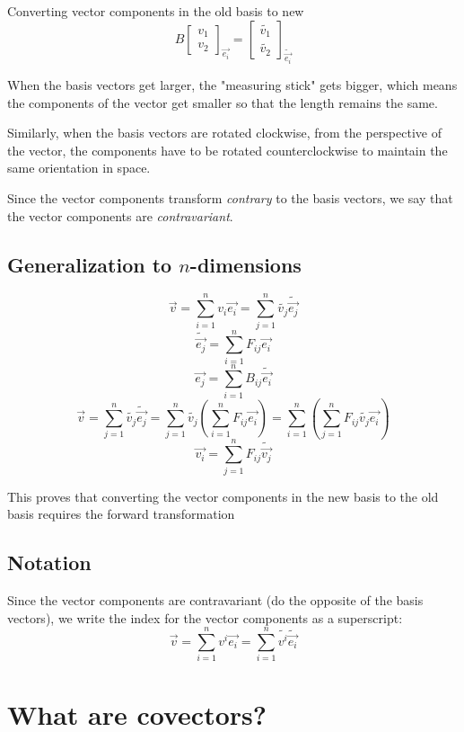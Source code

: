 \documentclass{report}
\begin{document}
Converting vector components in the old basis to new
$$ B\begin{bmatrix} v_1 \\ v_2 \end{bmatrix}_{\vec{e_i}} = \begin{bmatrix} \tilde{v_1} \\ \tilde{v_2} \end{bmatrix}_{\tilde{\vec{e_i}}}   $$ 

When the basis vectors get larger, the "measuring stick" gets bigger, which means the components of the vector get smaller so that the length remains the same.

Similarly, when the basis vectors are rotated clockwise, from the perspective of the vector, the components have to be rotated counterclockwise to maintain the same orientation in space.

Since the vector components transform \emph{contrary} to the basis vectors, we say that the vector components are \emph{contravariant}.

\section{Generalization to $n$-dimensions}
\begin{myproof}
	$$ \vec{v} = \sum_{i=1}^{n} v_i \vec{e_i} = \sum_{j=1}^{n} \tilde{v_j}\tilde{\vec{e_j}}$$
	$$ \widetilde{\vec{e_j}} = \sum_{i=1}^{n} F_{ij} \vec{e_i} $$ 
	$$ \vec{e_j} = \sum_{i=1}^{n} B_{ij} \widetilde{\vec{e_i}} $$ 
	$$ \vec{v} =  \sum_{j=1}^{n} \tilde{v_j}\tilde{\vec{e_j}} =  \sum_{j=1}^{n} \tilde{v_j} \left( \sum_{i=1}^{n} F_{ij} \vec{e_i} \right) = \sum_{i=1}^{n} \left(\sum_{j=1}^{n} F_{ij}  \widetilde{v_j}\vec{e_i}\right) $$
	$$ \vec{v_i} = \sum_{j=1}^{n} F_{ij} \widetilde{\vec{v_j}} $$ 

This proves that converting the vector components in the new basis to the old basis requires the forward transformation
\end{myproof}

\section{Notation}
Since the vector components are contravariant (do the opposite of the basis vectors), we write the index for the vector components as a superscript:
$$ \vec{v} = \sum_{i=1}^{n} v^i \vec{e_i}  = \sum_{i=1}^{n} \widetilde{v^i} \widetilde{\vec{e_i}}$$ 

\chapter{What are covectors?}
\end{document}
